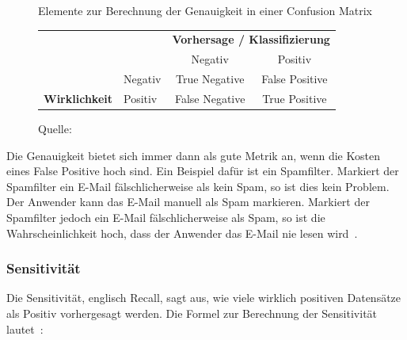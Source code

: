 \begin{figure}[h!]
    \centering
    \captionsetup{width=.9\linewidth}
    \caption{Elemente zur Berechnung der Genauigkeit in einer Confusion Matrix}
    \label{cm-precision}
    \def\arraystretch{1.5}
    \begin{tabular}{llcc}
        \multicolumn{2}{l}{}                                                                        & \multicolumn{2}{c}{\textbf{Vorhersage / Klassifizierung}}                                         \\ \cline{3-4} 
        \multicolumn{1}{c}{\textbf{}}                                & \multicolumn{1}{l|}{}        & \multicolumn{1}{c|}{Negativ}        & \multicolumn{1}{c|}{\cellcolor[HTML]{B5D0EE}Positiv}        \\ \cline{2-4} 
        \multicolumn{1}{l|}{}                                        & \multicolumn{1}{l|}{Negativ} & \multicolumn{1}{c|}{True Negative}  & \multicolumn{1}{c|}{\cellcolor[HTML]{B5D0EE}False Positive} \\ \cline{2-4} 
        \multicolumn{1}{l|}{\multirow{-2}{*}{\textbf{Wirklichkeit}}} & \multicolumn{1}{l|}{Positiv} & \multicolumn{1}{c|}{False Negative} & \multicolumn{1}{c|}{\cellcolor[HTML]{B5D0EE}True Positive}  \\ \cline{2-4} 
    \end{tabular}
    \vspace*{0.3cm}
    \caption*{Quelle: \textcite{TDSAccuracy}}
\end{figure}

Die Genauigkeit bietet sich immer dann als gute Metrik an, wenn die Kosten eines False Positive hoch sind. Ein Beispiel dafür ist ein Spamfilter. Markiert der Spamfilter ein E-Mail fälschlicherweise als kein Spam, so ist dies kein Problem. Der Anwender kann das E-Mail manuell als Spam markieren. Markiert der Spamfilter jedoch ein E-Mail fälschlicherweise als Spam, so ist die Wahrscheinlichkeit hoch, dass der Anwender das E-Mail nie lesen wird~\autocite{TDSAccuracy}.

\subsubsection{Sensitivität}

Die Sensitivität, englisch Recall, sagt aus, wie viele wirklich positiven Datensätze als Positiv vorhergesagt werden. Die Formel zur Berechnung der Sensitivität lautet~\autocite{TDSAccuracy}: 

\nopagebreak

